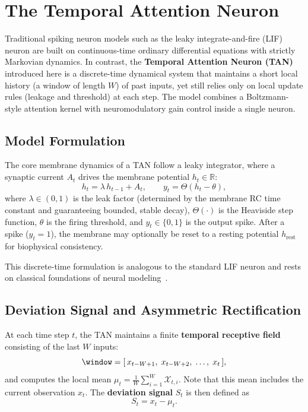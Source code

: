 \section{The Temporal Attention Neuron}\label{sec:model}

Traditional spiking neuron models such as the leaky integrate-and-fire (LIF) neuron are built on continuous-time ordinary differential equations with strictly Markovian dynamics. In contrast, the \textbf{Temporal Attention Neuron (TAN)} introduced here is a discrete-time dynamical system that maintains a short local history (a window of length $W$) of past inputs, yet still relies only on local update rules (leakage and threshold) at each step. The model combines a Boltzmann-style attention kernel with neuromodulatory gain control inside a single neuron.

\subsection{Model Formulation}

The core membrane dynamics of a TAN follow a leaky integrator, where a synaptic current $A_t$ drives the membrane potential $h_t \in \mathbb{R}$:
\begin{equation}\label{eq:membrane}
h_t = \lambda \, h_{t-1} + A_t, \qquad
y_t = \Theta(h_t - \theta),
\end{equation}
where $\lambda \in (0,1)$ is the leak factor (determined by the membrane RC time constant and guaranteeing bounded, stable decay), $\Theta(\cdot)$ is the Heaviside step function, $\theta$ is the firing threshold, and $y_t \in \{0,1\}$ is the output spike. After a spike ($y_t = 1$), the membrane may optionally be reset to a resting potential $h_{\text{rest}}$ for biophysical consistency.

This discrete-time formulation is analogous to the standard LIF neuron and rests on classical foundations of neural modeling~\cite{hodgkin1952,abbott1999}.

\subsection{Deviation Signal and Asymmetric Rectification}

At each time step $t$, the TAN maintains a finite \textbf{temporal receptive field} consisting of the last $W$ inputs:
\begin{equation}
\window = [\,x_{t-W+1},\; x_{t-W+2},\; \dots,\; x_t\,],
\end{equation}
and computes the local mean $\mu_t = \frac{1}{W}\sum_{i=1}^W \mathcal{X}_{t,i}$. Note that this mean includes the current observation $x_t$. The \textbf{deviation signal} $S_t$ is then defined as
\begin{equation}
S_t = x_t - \mu_t.
\end{equation}

